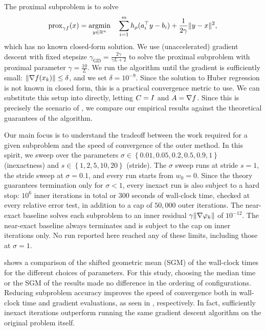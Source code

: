 \documentclass[11pt]{article}
\begin{document}
The proximal subproblem is to solve
\begin{align}
    \mathrm{prox}_{\gamma f}(x) = \mathop{\rm argmin}_{y\in\mathbb{R}^n} \quad \sum_{i=1}^{m} h_\rho(a_i^\top y - b_i) + \frac{1}{2\gamma}\lVert y - x\rVert^2, \label{eq:prox-huber}
\end{align}
which has no known closed-form solution.
We use (unaccelerated) gradient descent with fixed stepsize $\gamma_{\mathrm{GD}} = \frac{2\gamma}{\gamma L + 2}$ to solve the proximal subproblem  with proximal parameter $\gamma = \frac{10}{L}$.
We run the algorithm until the gradient is sufficiently small: $\lVert\nabla f(x_k)\rVert \leq \delta$, and we set $\delta = 10^{-9}$.
Since the solution to Huber regression is not known in closed form, this is a practical convergence metric to use.
We can substitute this setup into  directly, letting ${C} = I$ and ${A}=\nabla f$.
Since this is precisely the scenario of , we compare our empirical results against the theoretical guarantees of the algorithm.

Our main focus is to understand the tradeoff between the work required for a given subproblem and the speed of convergence of the outer method.
In this spirit, we sweep over the parameters $\sigma\in\left\{ 0.01, 0.05, 0.2, 0.5, 0.9, 1 \right\}$ (inexactness) and $s\in\left\{ 1,2,5,10,20 \right\}$ (stride).
The $\sigma$ sweep runs at stride $s = 1$, the stride sweep at $\sigma = 0.1$, and every run starts from $w_0 = 0$.
Since the theory guarantees termination only for $\sigma<1$, every inexact run is also subject to a hard stop: $10^{6}$ inner iterations in total or $300$ seconds of wall-clock time, checked at every relative error test, in addition to a cap of $50{,}000$ outer iterations.
The near-exact baseline solves each subproblem to an inner residual $\gamma\lVert\nabla\varphi_k\rVert$ of $10^{-12}$.
The near-exact baseline always terminates and is subject to the cap on inner iterations only.
No run reported here reached any of these limits, including those at $\sigma=1$.

 shows a comparison of the shifted geometric mean (SGM) of the wall-clock times for the different choices of parameters.
For this study, choosing the median time or the SGM of the results made no difference in the ordering of configurations.
Reducing subproblem accuracy improves the speed of convergence both in wall-clock time and gradient evaluations, as seen in , respectively.
In fact, sufficiently inexact iterations outperform running the same gradient descent algorithm on the original problem  itself.
\end{document}
